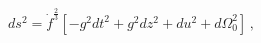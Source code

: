 \begin{equation}
ds^2 = {\dot f}^{\frac 23}[- g^2 dt^2 + g^2 dz^2 + du^2 + d\Omega_0^2]\,,
       \label{metrweier}
\end{equation}

